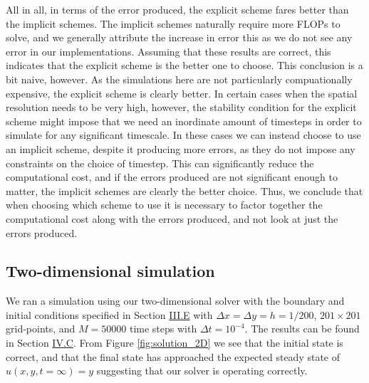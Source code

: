 \documentclass[reprint,english,notitlepage]{revtex4-1}  %
\begin{document}
All in all, in terms of the error produced, the explicit scheme fares better than the implicit schemes. The implicit schemes naturally require more FLOPs to solve, and we generally attribute the increase in error this as we do not see any error in our implementations. Assuming that these results are correct, this indicates that the explicit scheme is the better one to choose. This conclusion is a bit naive, however. As the simulations here are not particularly compuationally expensive, the explicit scheme is clearly better. In certain cases when the spatial resolution needs to be very high, however, the stability condition for the explicit scheme might impose that we need an inordinate amount of timesteps in order to simulate for any significant timescale. In these cases we can instead choose to use an implicit scheme, despite it producing more errors, as they do not impose any constraints on the choice of timestep. This can significantly reduce the computational cost, and if the errors produced are not significant enough to matter, the implicit schemes are clearly the better choice. Thus, we conclude that when choosing which scheme to use it is necessary to factor together the computational cost along with the errors produced, and not look at just the errors produced.    

\subsection{Two-dimensional simulation} \label{sec:discussion_2D}
We ran a simulation using our two-dimensional solver with the boundary and initial conditions specified in Section \hyperref[sec:method_2D_sim]{III.E} with \(\Delta x = \Delta y = h = 1/200\), \(201\times 201\) grid-points, and \(M = 50000\) time steps with \(\Delta t = 10^{-4}\). The results can be found in Section \hyperref[sec:results_2D]{IV.C}. From Figure \ref{fig:solution_2D} we see that the initial state is correct, and that the final state has approached the expected steady state of \(u(x, y, t=\infty) = y\) suggesting that our solver is operating correctly.
\end{document}
